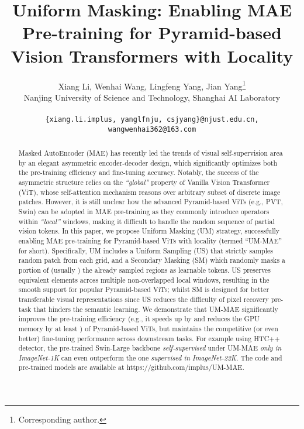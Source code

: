 \documentclass{article}
\title{Uniform Masking: Enabling MAE Pre-training for Pyramid-based Vision Transformers with Locality}
\author{Xiang Li, Wenhai Wang, Lingfeng Yang, Jian Yang\thanks{Corresponding author.}
\\
  Nanjing University of Science and Technology, Shanghai AI Laboratory
  \\
  \\
  \texttt{\scriptsize \{xiang.li.implus, yanglfnju, csjyang\}@njust.edu.cn, wangwenhai362@163.com} \\
}
\begin{document}
\maketitle

\begin{abstract}
Masked AutoEncoder (MAE) has recently led the trends of visual self-supervision area by an elegant asymmetric encoder-decoder design, which significantly optimizes both the pre-training efficiency and fine-tuning accuracy. Notably, the success of the asymmetric structure relies on the \emph{``global''} property of Vanilla Vision Transformer (ViT), whose self-attention mechanism reasons over arbitrary subset of discrete image patches. However, it is still unclear how the advanced Pyramid-based ViTs (e.g., PVT, Swin) can be adopted in MAE pre-training as they commonly introduce operators within \emph{``local''} windows, making it difficult to handle the random sequence of partial vision tokens. In this paper, we propose Uniform Masking (UM) strategy, successfully enabling MAE pre-training for Pyramid-based ViTs with locality (termed ``UM-MAE'' for short). Specifically, UM includes a Uniform Sampling (US) that strictly samples  random patch from each  grid, and a Secondary Masking (SM) which randomly masks a portion of (usually ) the already sampled regions as learnable tokens. US preserves equivalent elements across multiple non-overlapped local windows, resulting in the smooth support for popular Pyramid-based ViTs; whilst SM is designed for better transferable visual representations since US reduces the difficulty of pixel recovery pre-task that hinders the semantic learning. We demonstrate that UM-MAE significantly improves the pre-training efficiency (e.g., it speeds up by  and reduces the GPU memory by at least ) of Pyramid-based ViTs, but maintains the competitive (or even better) fine-tuning performance across downstream tasks. For example using HTC++ detector, the pre-trained Swin-Large backbone \emph{self-supervised} under UM-MAE \emph{only in ImageNet-1K} can even outperform the one \emph{supervised in ImageNet-22K}.
The code and pre-trained models are available at https://github.com/implus/UM-MAE.






\end{abstract}
\end{document}
